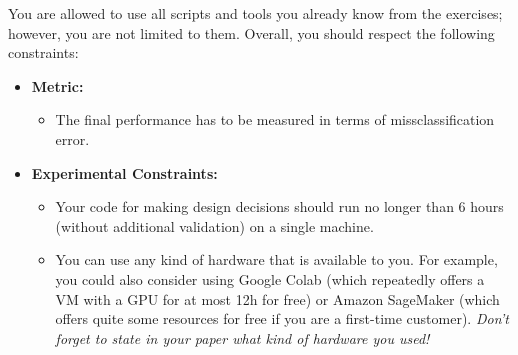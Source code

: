 \documentclass[10pt,a4paper]{article}
\begin{document}
		\newpage
		\noindent
		You are allowed to use all scripts and tools you already know from the exercises; however, you are not limited to them.
		Overall, you should respect the following constraints:
		\begin{itemize}
			\item \textbf{Metric:}
			\begin{itemize}
				\item The final performance has to be measured in terms of missclassification error.
			\end{itemize}
			\item \textbf{Experimental Constraints:}
			\begin{itemize}
				\item Your code for making design decisions should run no longer than $6$ hours (without additional validation) on a single machine.
				\item You can use any kind of hardware that is available to you. For example, you could also consider using Google Colab (which repeatedly offers a VM with a GPU for at most 12h for free) or Amazon SageMaker (which offers quite some resources for free if you are a first-time customer). \textit{Don't forget to state in your paper what kind of hardware you used!}
			\end{itemize}
		\end{itemize}


        \gccs

		\newpage
		\grading

\end{document}
